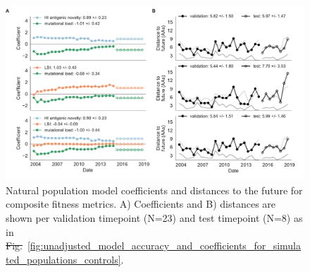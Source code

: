 \documentclass[9pt,lineno]{elife} %
\providecommand{\DIFadd}[1]{{\protect\color{blue}\uwave{#1}}} %
\providecommand{\DIFdel}[1]{{\protect\color{red}\sout{#1}}}                      %
\providecommand{\DIFaddFL}[1]{\DIFadd{#1}} %
\providecommand{\DIFdelFL}[1]{\DIFdel{#1}} %
\providecommand{\DIFaddbeginFL}{} %
\providecommand{\DIFaddendFL}{} %
\providecommand{\DIFdelbeginFL}{} %
\providecommand{\DIFdelendFL}{} %
\providecommand{\DIFaddtex}[1]{{\protect\color{blue}\uwave{#1}}} %
\providecommand{\DIFdeltex}[1]{{\protect\color{red}\sout{#1}}}                      %
\providecommand{\DIFaddFL}[1]{\DIFadd{#1}} %
\providecommand{\DIFdelFL}[1]{\DIFdel{#1}} %
\providecommand{\DIFaddbeginFL}{} %
\providecommand{\DIFaddendFL}{} %
\providecommand{\DIFdelbeginFL}{} %
\providecommand{\DIFdelendFL}{} %
\providecommand{\DIFadd}[1]{\texorpdfstring{\DIFaddtex{#1}}{#1}} %
\providecommand{\DIFdel}[1]{\texorpdfstring{\DIFdeltex{#1}}{}} %
\newcommand{\DIFscaledelfig}{0.5}
\newlength{\DIFdelgraphicswidth} %
\newlength{\DIFdelgraphicsheight} %
\newcommand{\DIFaddincludegraphics}[2][]{{\color{blue}\fbox{\DIFOincludegraphics[#1]{#2}}}} %
\newcommand{\DIFdelincludegraphics}[2][]{%
\sbox{\DIFdelgraphicsbox}{\DIFOincludegraphics[#1]{#2}}%
\settoboxwidth{\DIFdelgraphicswidth}{\DIFdelgraphicsbox} %
\settoboxtotalheight{\DIFdelgraphicsheight}{\DIFdelgraphicsbox} %
\scalebox{\DIFscaledelfig}{%
\parbox[b]{\DIFdelgraphicswidth}{\usebox{\DIFdelgraphicsbox}\\[-\baselineskip] \rule{\DIFdelgraphicswidth}{0em}}\llap{\resizebox{\DIFdelgraphicswidth}{\DIFdelgraphicsheight}{%
\setlength{\unitlength}{\DIFdelgraphicswidth}%
\begin{picture}(1,1)%
\thicklines\linethickness{2pt} %
{\color[rgb]{1,0,0}\put(0,0){\framebox(1,1){}}}%
{\color[rgb]{1,0,0}\put(0,0){\line( 1,1){1}}}%
{\color[rgb]{1,0,0}\put(0,1){\line(1,-1){1}}}%
\end{picture}%
}\hspace*{3pt}}} %
} %
\DeclareRobustCommand{\DIFaddbeginFL}{\DIFOaddbeginFL \let\includegraphics\DIFaddincludegraphics} %
\DeclareRobustCommand{\DIFaddendFL}{\DIFOaddendFL \let\includegraphics\DIFOincludegraphics} %
\DeclareRobustCommand{\DIFdelbeginFL}{\DIFOdelbeginFL \let\includegraphics\DIFdelincludegraphics} %
\DeclareRobustCommand{\DIFdelendFL}{\DIFOaddendFL \let\includegraphics\DIFOincludegraphics} %
\begin{document}
\begin{figure}[htb]
  \DIFdelbeginFL %
\DIFdelendFL \DIFaddbeginFL \includegraphics[width=\textwidth]{Figure_6.pdf}
  \DIFaddendFL \caption{
    Natural population model coefficients and distances to the future for composite fitness metrics.
    A) Coefficients and B) distances are shown per validation timepoint (N=23) and test timepoint (N=8) as in \DIFdelbeginFL \DIFdelFL{Fig.}\DIFdelendFL \DIFaddbeginFL \DIFaddFL{Figure}\DIFaddendFL ~\ref{fig:unadjusted_model_accuracy_and_coefficients_for_simulated_populations_controls}.
  }
  \label{fig:unadjusted_composite_model_accuracy_and_coefficients_for_natural_populations}
\DIFdelbeginFL %
\DIFdelendFL \DIFaddbeginFL 


\end{figure}
\end{document}

